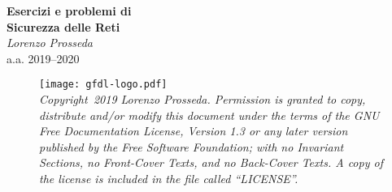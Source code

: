 
\begin{titlepage}
    \centering %
    \Huge\textbf{Esercizi e problemi di\\Sicurezza delle Reti}\\
    \Large\emph{Lorenzo Prosseda}\\
    \bigskip
    \large a.a. 2019\---2020 \\
    \begin{figure}[h] %
        \texttt{[image: gfdl-logo.pdf]}
        \bigskip \\
        \small\emph{Copyright \textcopyright\,2019 Lorenzo Prosseda. Permission is granted to copy, distribute and/or modify this document under the terms of the GNU Free Documentation License, Version 1.3 or any later version published by the Free Software Foundation; with no Invariant Sections, no Front-Cover Texts, and no Back-Cover Texts. A copy of the license is included in the file called ``LICENSE''.}
    \end{figure}
\end{titlepage}
